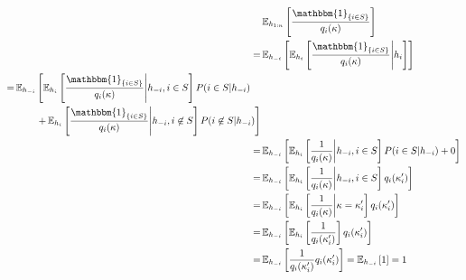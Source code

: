 \begin{align*}
    & \, \mathbb{E}_{h_{1:n}}\left[\frac{\mathbbm{1}_{\{i \in S\}}}{q_i(\kappa)}\right] \\
    = & \, \mathbb{E}_{h_{-i}}\left[\mathbb{E}_{h_i}\left[\frac{\mathbbm{1}_{\{i \in S\}}}{q_i(\kappa)}\middle|h_i\right]\right] \\
    \begin{split}
    = & \, \mathbb{E}_{h_{-i}}\left[\mathbb{E}_{h_i}\left[\frac{\mathbbm{1}_{\{i \in S\}}}{q_i(\kappa)}\middle|h_{-i},i \in S\right]P(i \in S | h_{-i}) \right. \\
    & \hphantom{\mathbb{E}_{h_{-i}}}\left. \, + \, \mathbb{E}_{h_i}\left[\frac{\mathbbm{1}_{\{i \in S\}}}{q_i(\kappa)}\middle|h_{-i},i \not\in S\right]P(i \not\in S | h_{-i})
    \right]
    \end{split} \\
    = & \, \mathbb{E}_{h_{-i}}\left[\mathbb{E}_{h_i}\left[\frac{1}{q_i(\kappa)}\middle|h_{-i},i \in S\right]P(i \in S | h_{-i}) + 0 \right] \\
    = & \, \mathbb{E}_{h_{-i}}\left[\mathbb{E}_{h_i}\left[\frac{1}{q_i(\kappa)}\middle|h_{-i},i \in S\right] q_i(\kappa'_i) \right] \\
    = & \, \mathbb{E}_{h_{-i}}\left[\mathbb{E}_{h_i}\left[\frac{1}{q_i(\kappa)}\middle|\kappa = \kappa'_i \right] q_i(\kappa'_i) \right] \\
    = & \, \mathbb{E}_{h_{-i}}\left[\mathbb{E}_{h_i}\left[\frac{1}{q_i(\kappa'_i)} \right] q_i(\kappa'_i) \right] \\
    = & \, \mathbb{E}_{h_{-i}}\left[\frac{1}{q_i(\kappa'_i)} q_i(\kappa'_i) \right] = \mathbb{E}_{h_{-i}}\left[ 1 \right] = 1 \\
\end{align*}